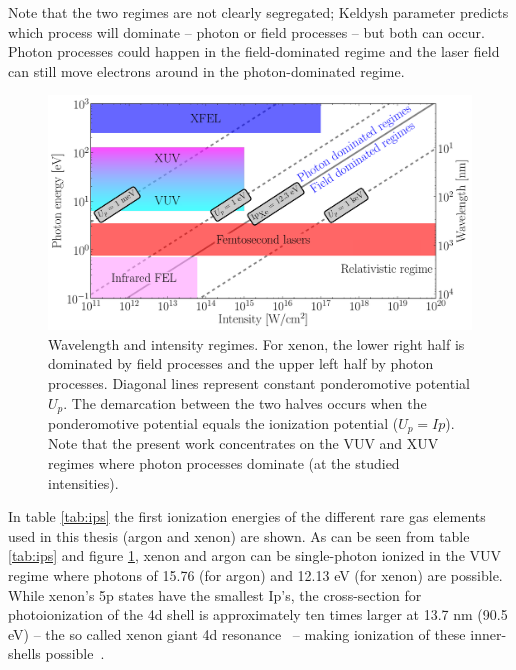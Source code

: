 Note that the two regimes are not clearly segregated; Keldysh parameter
predicts which process will dominate -- photon or field processes --
but both can occur. Photon processes could happen in the field-dominated
regime and the laser field can still move electrons around in the photon-dominated regime.

\begin{figure}
\centering
\includegraphics[width=\figurewidth]{figures/regimes}
\caption{Wavelength and intensity regimes. For xenon, the lower right half is dominated
         by field processes and the upper left half by photon processes. Diagonal
         lines represent constant ponderomotive potential $U_p$. The
         demarcation between the two halves occurs when the ponderomotive
         potential equals the ionization potential ($U_p = Ip$).
         Note that the present work concentrates on the VUV and XUV regimes
         where photon processes dominate (at the studied intensities).}
\label{fig:regimes}
\end{figure}

In table \ref{tab:ips} the first ionization energies of the different
rare gas elements used in this thesis (argon and xenon) are shown. As can be
seen from table \ref{tab:ips} and figure \ref{fig:regimes}, xenon and argon can be
single-photon ionized in the VUV regime where photons of 15.76 (for argon)
and 12.13 eV (for xenon) are possible. While xenon's 5p states have the smallest
Ip's, the cross-section for photoionization of the 4d shell is approximately ten
times larger at 13.7 nm (90.5 eV) -- the so called xenon giant 4d
resonance~\cite{Becker1986} -- making ionization of these inner-shells
possible~\cite{Thomas2009,Ackad2013}.

